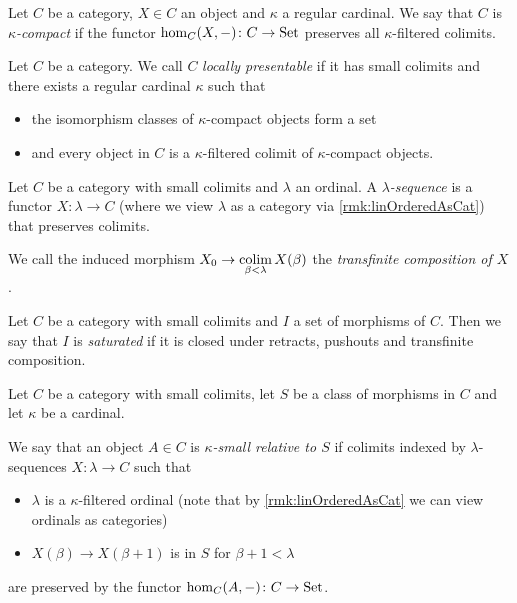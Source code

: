 \begin{definition}\label{def:kappaCompactObject}
    Let $C$ be a category, $X\in C$ an object and $\kappa$ a regular cardinal.
    We say that $C$ is \emph{$\kappa$-compact} if the functor $\hom_C(X,-)\colon C\to\operatorname{Set}$ preserves all $\kappa$-filtered colimits.
\end{definition}
\begin{definition} %
    Let $C$ be a category.
    We call $C$ \emph{locally presentable} if it has small colimits and there exists a regular cardinal $\kappa$ such that
    \begin{itemize}
        \item the isomorphism classes of $\kappa$-compact objects form a set
        \item and every object in $C$ is a $\kappa$-filtered colimit of $\kappa$-compact objects.
    \end{itemize}
\end{definition}
\begin{definition} %
    Let $C$ be a category with small colimits and $\lambda$ an ordinal.
    A \emph{$\lambda$-sequence} is a functor $X\colon\lambda\to C$ (where we view $\lambda$ as a category via \cref{rmk:linOrderedAsCat}) that preserves colimits.

    We call the induced morphism $X_0\to\operatorname*{colim}\limits_{\beta<\lambda} X(\beta)$ the \emph{transfinite composition of $X$}.
\end{definition}
\begin{definition}
    Let $C$ be a category with small colimits and $I$ a set of morphisms of $C$.
    Then we say that $I$ is \emph{saturated} if it is closed under retracts, pushouts and transfinite composition.
\end{definition}
\begin{definition} %
    Let $C$ be a category with small colimits, let $S$ be a class of morphisms in $C$ and let $\kappa$ be a cardinal.
    
    We say that an object $A\in C$ is \emph{$\kappa$-small relative to $S$} if colimits indexed by $\lambda$-sequences $X\colon\lambda\to C$ such that 
    \begin{itemize}
        \item $\lambda$ is a $\kappa$-filtered ordinal (note that by \cref{rmk:linOrderedAsCat} we can view ordinals as categories)
        \item $X(\beta)\to X(\beta+1)$ is in $S$ for $\beta+1<\lambda$
    \end{itemize}
    are preserved by the functor $\hom_C(A,-)\colon C\to\operatorname{Set}$.
\end{definition}
